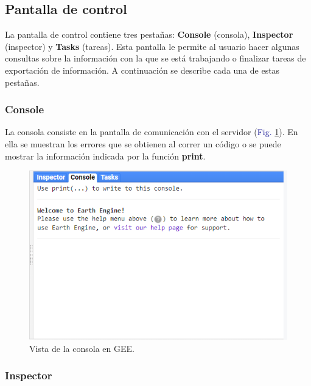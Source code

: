 \documentclass[
  12pt,
  letterpaper,
  twoside]{book}
\newcommand\boldpurple[1]{\textcolor{darkpurple}{\textbf{#1}}}
\begin{document}
\hypertarget{pantalla-de-control}{%
\subsection*{Pantalla de control}\label{pantalla-de-control}}

La pantalla de control contiene tres pestañas: \textbf{Console} (consola), \textbf{Inspector} (inspector) y \textbf{Tasks} (tareas). Esta pantalla le permite al usuario hacer algunas consultas sobre la información con la que se está trabajando o finalizar tareas de exportación de información. A continuación se describe cada una de estas pestañas.

\hypertarget{console}{%
\subsubsection*{Console}\label{console}}

La consola consiste en la pantalla de comunicación con el servidor (\textcolor{darkblue}{Fig.} \ref{fig:f219}). En ella se muestran los errores que se obtienen al correr un código o se puede mostrar la información indicada por la función \boldpurple{print}.

\begin{figure}[H]

{\centering \includegraphics[width=0.8\linewidth]{Img/rigthPanel} 

}

\caption{Vista de la consola en GEE.}\label{fig:f219}
\end{figure}

\hypertarget{inspector}{%
\subsubsection*{Inspector}\label{inspector}}
\end{document}
